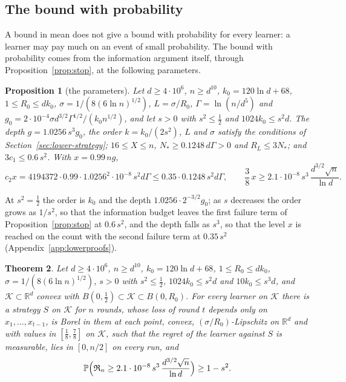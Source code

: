 \documentclass[11pt]{amsart}
\newtheorem{theorem}{Theorem}[section]
\newtheorem{proposition}[theorem]{Proposition}
\theoremstyle{definition}
\numberwithin{equation}{section}
\newcommand{\R}{\mathbb{R}}
\newcommand{\Prob}{\mathbb{P}}
\newcommand{\cK}{\mathcal{K}}
\newcommand{\Reg}{\mathfrak{R}}
\begin{document}
\subsection{The bound with probability}\label{sec:lower-prob}

A bound in mean does not give a bound with probability for every learner: a learner may pay much on an event of small probability. The bound with probability comes from the information argument itself, through Proposition~\ref{prop:stop}, at the following parameters.

\begin{proposition}[the parameters]\label{prop:game}
Let $d\ge4\cdot10^6$, $n\ge d^{10}$, $k_0=120\ln d+68$, $1\le R_0\le dk_0$, $\sigma=1/(8(6\ln n)^{1/2})$, $L=\sigma/R_0$, $\Gamma=\ln(n/d^5)$ and $g_0=2\cdot10^{-4}\sigma d^{3/2}\Gamma^{1/2}/(k_0n^{1/2})$, and let $s>0$ with $s^2\le\frac12$ and $1024k_0\le s^2d$. The depth $g=1.0256\,s^3g_0$, the order $k=k_0/(2s^2)$, $L$ and $\sigma$ satisfy the conditions of Section~\ref{sec:lower-strategy}; $16\le X\le n$, $N_*\ge0.1248\,d\Gamma>0$ and $R_L\le3N_*$; and $3c_1\le0.6\,s^2$. With $x=0.99\,ng$,
\[
c_2x=4194372\cdot0.99\cdot1.0256^2\cdot10^{-8}\,s^2d\Gamma\le0.35\cdot0.1248\,s^2d\Gamma,\qquad\frac38\,x\ge2.1\cdot10^{-8}\,s^3\,\frac{d^{3/2}\sqrt n}{\ln d}.
\]
\end{proposition}

At $s^2=\frac12$ the order is $k_0$ and the depth $1.0256\cdot2^{-3/2}g_0$; as $s$ decreases the order grows as $1/s^2$, so that the information budget leaves the first failure term of Proposition~\ref{prop:stop} at $0.6\,s^2$, and the depth falls as $s^3$, so that the level $x$ is reached on the count with the second failure term at $0.35\,s^2$ (Appendix~\ref{app:lowerproofs}).

\begin{theorem}\label{thm:lowerbody}
Let $d\ge4\cdot10^6$, $n\ge d^{10}$, $k_0=120\ln d+68$, $1\le R_0\le dk_0$, $\sigma=1/(8(6\ln n)^{1/2})$, $s>0$ with $s^2\le\frac12$, $1024k_0\le s^2d$ and $10k_0\le s^3d$, and $\cK\subset\R^d$ convex with $B(0,\frac12)\subset\cK\subset B(0,R_0)$. For every learner on $\cK$ there is a strategy $S$ on $\cK$ for $n$ rounds, whose loss of round $t$ depends only on $x_1,\dots,x_{t-1}$, is Borel in them at each point, convex, $(\sigma/R_0)$-Lipschitz on $\R^d$ and with values in $[\frac18,\frac78]$ on $\cK$, such that the regret of the learner against $S$ is measurable, lies in $[0,n/2]$ on every run, and
\[
\Prob\Bigl(\Reg_n\ge2.1\cdot10^{-8}\,s^3\,\frac{d^{3/2}\sqrt n}{\ln d}\Bigr)\ge1-s^2.
\]
\end{theorem}
\end{document}
